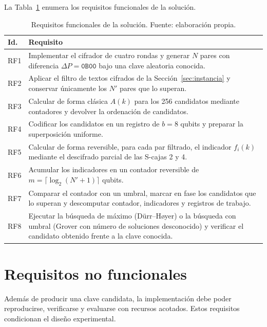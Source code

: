 La Tabla~\ref{tab:rf} enumera los requisitos funcionales de la solución.

\begin{table}[H]
\centering
\small
\begin{tabular}{p{} p{}}
\hline\hline
Id. & Requisito \\
\hline
RF1 & Implementar el cifrador de cuatro rondas y generar \(N\) pares con diferencia \(\Delta P=\texttt{0B00}\) bajo una clave aleatoria conocida. \\
RF2 & Aplicar el filtro de textos cifrados de la Sección~\ref{sec:instancia} y conservar únicamente los \(N'\) pares que lo superan. \\
RF3 & Calcular de forma clásica \(A(k)\) para los 256 candidatos mediante contadores y devolver la ordenación de candidatos. \\
RF4 & Codificar los candidatos en un registro de \(b=8\) qubits y preparar la superposición uniforme. \\
RF5 & Calcular de forma reversible, para cada par filtrado, el indicador \(f_i(k)\) mediante el descifrado parcial de las S-cajas 2 y 4. \\
RF6 & Acumular los indicadores en un contador reversible de \(m=\lceil\log_2(N'+1)\rceil\) qubits. \\
RF7 & Comparar el contador con un umbral, marcar en fase los candidatos que lo superan y descomputar contador, indicadores y registros de trabajo. \\
RF8 & Ejecutar la búsqueda de máximo (Dürr--Høyer) o la búsqueda con umbral (Grover con número de soluciones desconocido) y verificar el candidato obtenido frente a la clave conocida. \\
\hline
\end{tabular}
\caption[Requisitos funcionales]{Requisitos funcionales de la solución. Fuente: elaboración propia.}
\label{tab:rf}
\end{table}

\section{Requisitos no funcionales}

Además de producir una clave candidata, la implementación debe poder reproducirse, verificarse y evaluarse con recursos acotados. Estos requisitos condicionan el diseño experimental.

